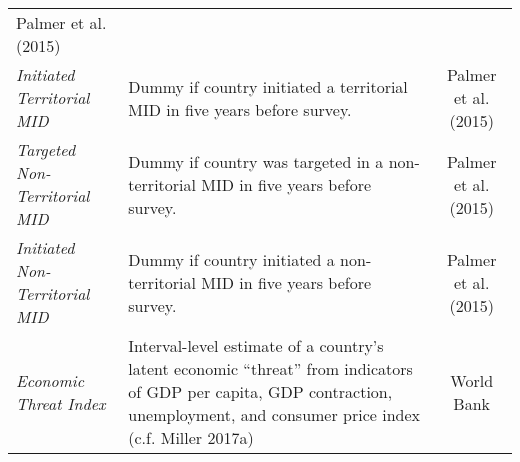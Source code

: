 \documentclass[11pt,]{article}
\begin{document}
\begin{longtable}[]{@{}llc@{}}
\begin{minipage}[t]{0.22\columnwidth}
Palmer et al. (2015)\strut
\end{minipage}\tabularnewline
\begin{minipage}[t]{0.19\columnwidth}\raggedright\strut
\emph{Initiated Territorial MID}\strut
\end{minipage} & \begin{minipage}[t]{0.46\columnwidth}\raggedright\strut
Dummy if country initiated a territorial MID in five years before
survey.\strut
\end{minipage} & \begin{minipage}[t]{0.22\columnwidth}\centering\strut
Palmer et al. (2015)\strut
\end{minipage}\tabularnewline
\begin{minipage}[t]{0.19\columnwidth}\raggedright\strut
\emph{Targeted Non-Territorial MID}\strut
\end{minipage} & \begin{minipage}[t]{0.46\columnwidth}\raggedright\strut
Dummy if country was targeted in a non-territorial MID in five years
before survey.\strut
\end{minipage} & \begin{minipage}[t]{0.22\columnwidth}\centering\strut
Palmer et al. (2015)\strut
\end{minipage}\tabularnewline
\begin{minipage}[t]{0.19\columnwidth}\raggedright\strut
\emph{Initiated Non-Territorial MID}\strut
\end{minipage} & \begin{minipage}[t]{0.46\columnwidth}\raggedright\strut
Dummy if country initiated a non-territorial MID in five years before
survey.\strut
\end{minipage} & \begin{minipage}[t]{0.22\columnwidth}\centering\strut
Palmer et al. (2015)\strut
\end{minipage}\tabularnewline
\begin{minipage}[t]{0.19\columnwidth}\raggedright\strut
\emph{Economic Threat Index}\strut
\end{minipage} & \begin{minipage}[t]{0.46\columnwidth}\raggedright\strut
Interval-level estimate of a country's latent economic ``threat'' from
indicators of GDP per capita, GDP contraction, unemployment, and
consumer price index (c.f. Miller 2017a)\strut
\end{minipage} & \begin{minipage}[t]{0.22\columnwidth}\centering\strut
World Bank\strut

\end{minipage}
\end{longtable}
\end{document}
